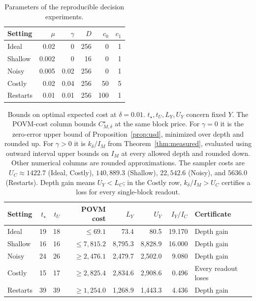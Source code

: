 \begin{table}[htbp]
\centering\small
\begin{tabular}{lrrrrr}
\toprule
Setting & $\mu$ & $\gamma$ & $D$ & $c_0$ & $c_1$\\
\midrule
Ideal & 0.02 & 0 & 256 & 0 & 1\\
Shallow & 0.002 & 0 & 16 & 0 & 1\\
Noisy & 0.005 & 0.02 & 256 & 0 & 1\\
Costly & 0.02 & 0.04 & 256 & 50 & 5\\
Restarts & 0.01 & 0.01 & 256 & 100 & 1\\
\bottomrule\end{tabular}
\caption{Parameters of the reproducible decision experiments.}
\end{table}
\begin{table}[htbp]
\centering\small
\setlength{\tabcolsep}{3pt}
\begin{tabular}{lrrrrrrl}
\toprule
Setting & $t_\star$ & $t_U$ & POVM cost & $L_Y$ & $U_Y$ & $I_Y/I_C$ & Certificate\\
\midrule
Ideal & 19 & 18 & $\leq 69.1$ & 73.4 & 80.5 & 19.170 & Depth gain\\
Shallow & 16 & 16 & $\leq 7{,}815.2$ & 8,795.3 & 8,828.9 & 16.000 & Depth gain\\
Noisy & 24 & 26 & $\geq 2{,}476.1$ & 2,479.7 & 2,502.0 & 9.080 & Depth gain\\
Costly & 15 & 17 & $\geq 2{,}825.4$ & 2,834.6 & 2,908.6 & 0.496 & Every readout loses\\
Restarts & 39 & 39 & $\geq 1{,}254.0$ & 1,268.9 & 1,443.3 & 4.436 & Depth gain\\
\bottomrule\end{tabular}
\caption{Bounds on optimal expected cost at $\delta=0.01$.
$t_\star,t_U,L_Y,U_Y$ concern fixed $Y$. The POVM-cost column bounds
$C^\star_{M,\delta}$ at the same block price. For $\gamma=0$ it is the
zero-error upper bound of Proposition~\ref{prop:usd}, minimized over depth
and rounded up. For $\gamma>0$ it is $k_\delta/I_M$ from
Theorem~\ref{thm:measured}, evaluated using outward interval upper bounds
on $I_M$ at every allowed depth and rounded down.
Other numerical columns are rounded approximations.
The sampler costs are $U_C\approx1422.7$ (Ideal, Costly),
$140{,}889.3$ (Shallow), $22{,}542.6$ (Noisy), and $5636.0$ (Restarts).
Depth gain means $U_Y<L_C$; in the Costly row,
$k_\delta/I_M>U_C$ certifies a loss for every single-block readout.}
\label{tab:researchresults}
\end{table}
